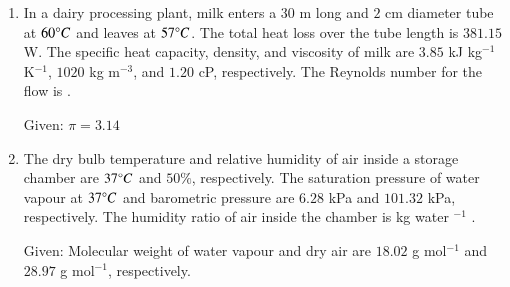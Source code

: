 \documentclass[journal,12pt,onecolumn]{IEEEtran}
\theoremstyle{remark}
\begin{document}
\begin{enumerate}
    \item In a dairy processing plant, milk enters a $30$ m long and $2$ cm diameter tube at $60 \degree C$ and leaves at $57 \degree C$. The total heat loss over the tube length is $381.15$ W. The specific heat capacity, density, and viscosity of milk are $3.85$ kJ kg$^{-1}$ K$^{-1}$, $1020$ kg m$^{-3}$, and $1.20$ cP, respectively. The Reynolds number for the flow is \underline{\hspace{2cm}} .
    
    \hfill{}
    
    Given: $\pi = 3.14$
    
    \item The dry bulb temperature and relative humidity of air inside a storage chamber are $37 \degree C$ and $50\%$, respectively. The saturation pressure of water vapour at $37 \degree C$ and barometric pressure are $6.28$ kPa and $101.32$ kPa, respectively. The humidity ratio of air inside the chamber is \underline{\hspace{2cm}} kg water $^{-1}$ .
    
    \hfill{}
    
    Given: Molecular weight of water vapour and dry air are $18.02$ g mol$^{-1}$ and $28.97$ g mol$^{-1}$, respectively.
    
\end{enumerate}
\end{document}
